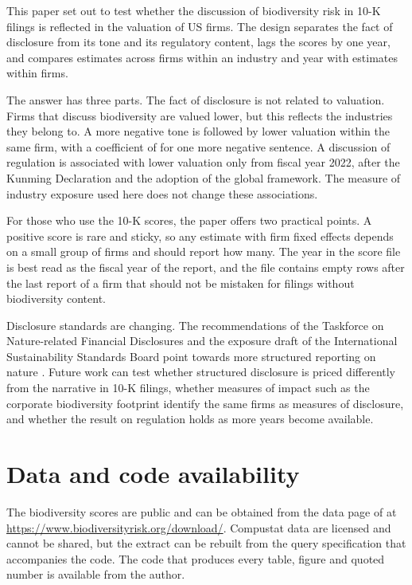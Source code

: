\documentclass[12pt,a4paper]{article}
\begin{document}
This paper set out to test whether the discussion of biodiversity risk in 10-K filings is reflected in the valuation of US firms. The design separates the fact of disclosure from its tone and its regulatory content, lags the scores by one year, and compares estimates across firms within an industry and year with estimates within firms.

The answer has three parts. The fact of disclosure is not related to valuation. Firms that discuss biodiversity are valued lower, but this reflects the industries they belong to. A more negative tone is followed by lower valuation within the same firm, with a coefficient of \coefFAllNeg{} for one more negative sentence. A discussion of regulation is associated with lower valuation only from fiscal year 2022, after the Kunming Declaration and the adoption of the global framework. The measure of industry exposure used here does not change these associations.

For those who use the 10-K scores, the paper offers two practical points. A positive score is rare and sticky, so any estimate with firm fixed effects depends on a small group of firms and should report how many. The year in the score file is best read as the fiscal year of the report, and the file contains empty rows after the last report of a firm that should not be mistaken for filings without biodiversity content.

Disclosure standards are changing. The recommendations of the Taskforce on Nature-related Financial Disclosures and the exposure draft of the International Sustainability Standards Board point towards more structured reporting on nature \citep{tnfd2023,issb2026}. Future work can test whether structured disclosure is priced differently from the narrative in 10-K filings, whether measures of impact such as the corporate biodiversity footprint identify the same firms as measures of disclosure, and whether the result on regulation holds as more years become available.

\section*{Data and code availability}

The biodiversity scores are public and can be obtained from the data page of \citet{giglio2026} at \url{https://www.biodiversityrisk.org/download/}. Compustat data are licensed and cannot be shared, but the extract can be rebuilt from the query specification that accompanies the code. The code that produces every table, figure and quoted number is available from the author.
\end{document}
